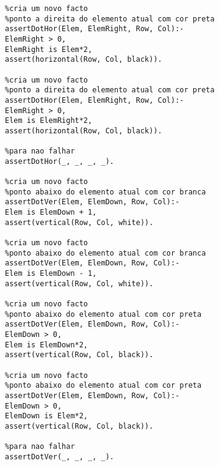 \documentclass[runningheads,a4paper]{llncs}
\begin{document}
\begin{changemargin}{-3cm}{-4cm}
\begin{verbatim}
%cria um novo facto
%ponto a direita do elemento atual com cor preta
assertDotHor(Elem, ElemRight, Row, Col):-
ElemRight > 0,
ElemRight is Elem*2,
assert(horizontal(Row, Col, black)).

%cria um novo facto
%ponto a direita do elemento atual com cor preta
assertDotHor(Elem, ElemRight, Row, Col):-
ElemRight > 0,
Elem is ElemRight*2,
assert(horizontal(Row, Col, black)).

%para nao falhar
assertDotHor(_, _, _, _).

%cria um novo facto
%ponto abaixo do elemento atual com cor branca
assertDotVer(Elem, ElemDown, Row, Col):-
Elem is ElemDown + 1,
assert(vertical(Row, Col, white)).

%cria um novo facto
%ponto abaixo do elemento atual com cor branca
assertDotVer(Elem, ElemDown, Row, Col):-
Elem is ElemDown - 1,
assert(vertical(Row, Col, white)).

%cria um novo facto
%ponto abaixo do elemento atual com cor preta
assertDotVer(Elem, ElemDown, Row, Col):-
ElemDown > 0,
Elem is ElemDown*2,
assert(vertical(Row, Col, black)).

%cria um novo facto
%ponto abaixo do elemento atual com cor preta
assertDotVer(Elem, ElemDown, Row, Col):-
ElemDown > 0,
ElemDown is Elem*2,
assert(vertical(Row, Col, black)).

%para nao falhar
assertDotVer(_, _, _, _).

		\end{verbatim}
	\end{changemargin}
	
\end{document}
